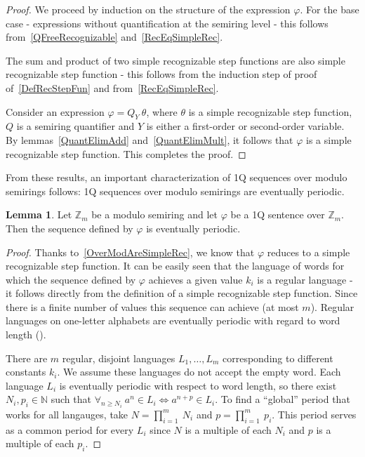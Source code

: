 \documentclass[12pt]{article}
\theoremstyle{definition}
\newtheorem{lemma}[theorem]{Lemma}
\begin{document}
\begin{proof}
    We proceed by induction on the structure of the expression $\varphi$. For the base case - expressions without quantification at the semiring level - this follows from~\cref{QFreeRecognizable} and~\cref{RecEqSimpleRec}. 
    
    The sum and product of two simple recognizable step functions are also simple recognizable step function - this follows from the induction step of proof of~\cref{DefRecStepFun} and from~\cref{RecEqSimpleRec}.

    Consider an expression $\varphi = Q_Y \ \theta$, where $\theta$ is a simple recognizable step function, $Q$ is a semiring quantifier and $Y$ is either a first-order or second-order variable. By lemmas~\ref{QuantElimAdd} and~\ref{QuantElimMult}, it follows that $\varphi$ is a simple recognizable step function. This completes the proof.
\end{proof}

From these results, an important characterization of 1Q sequences over modulo semirings follows: 1Q sequences over modulo semirings are eventually periodic.

\begin{lemma}
    \label{OverModAreSimpleRec2}
    Let $\mathbb{Z}_m$ be a modulo semiring and let $\varphi$ be a 1Q sentence over $\mathbb{Z}_m$. Then the sequence defined by $\varphi$ is eventually periodic.
\end{lemma}

\begin{proof}
    Thanks to~\cref{OverModAreSimpleRec}, we know that $\varphi$ reduces to a simple recognizable step function. It can be easily seen that the language of words for which the sequence defined by $\varphi$ achieves a given value $k_i$ is a regular language - it follows directly from the definition of a simple recognizable step function. Since there is a finite number of values this sequence can achieve (at most $m$). Regular languages on one-letter alphabets are eventually periodic with regard to word length (\cite[Theorem 1]{PighizziniS02}).

    There are $m$ regular, disjoint languages $L_1, \ldots, L_m$ corresponding to different constants $k_i$. We assume these languages do not accept the empty word. Each language $L_i$ is eventually periodic with respect to word length, so there exist $N_i, p_i \in \mathbb{N}$ such that $\forall_{n \geq N_i} \ a^n \in L_i \iff a^{n + p} \in L_i$. To find a ``global'' period that works for all langauges, take $N = \prod_{i=1}^m \ N_i$ and $p = \prod_{i=1}^m \ p_i$. This period serves as a common period for every $L_i$ since $N$ is a multiple of each $N_i$ and $p$ is a multiple of each $p_i$.
\end{proof}
\end{document}
